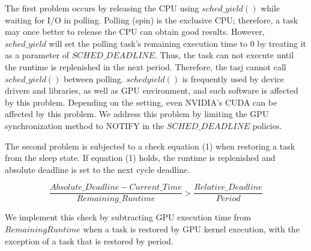The first problem occurs by releasing the CPU using $sched\_yield()$ while waiting for I/O in polling.
Polling (spin) is the exclusive CPU; therefore, a task may once better to release the CPU can obtain good results.
However, $sched\_yield$ will set the polling task’s remaining execution time to 0 by treating it as a parameter of $SCHED\_DEADLINE$.
Thus, the task can not execute until the runtime is replenished in the next period.
Therefore, the tasj cannot call $sched\_yield()$ between polling.
$sched yield()$ is frequently used by device drivers and libraries, as well as GPU environment, and such software is affected by this problem.
Depending on the setting, even NVIDIA’s CUDA can be affected by this problem.
We address this problem by limiting the GPU synchronization method to NOTIFY in the $SCHED\_DEADLINE$ policies.


The second problem is subjected to a check equation (1) when restoring a task from the sleep state.
If equation (1) holds, the runtime is replenished and absolute deadline is set to the next cycle deadline.

{\scriptsize
\begin{equation}
\frac{Absolute\_Deadline - Current\_Time}{Remaining\_Runtime} > \frac{Relative\_Deadline}{Period}
\end{equation}
}

We implement this check by subtracting GPU execution time from $Remaining Runtime$ when a task is restored by GPU kernel execution, with the exception of a task that is restored by period.
